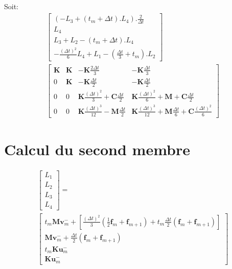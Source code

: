 \documentclass[12pt,a4paper]{report}
\begin{document}
Soit:
\begin{equation}
\begin{array}{c}
	\begin{bmatrix}	
		  \left( - L_3 + (t_m+\Delta t).L_4 \right)
		  	.\frac{2}{\Delta t}
		\\ L_4
		\\ L_3 + L_2 - (t_m+\Delta t).L_4
		\\ -\frac{(\Delta t)^2}{6} L_4 
			+ L_1 
			- \left( \frac{\Delta t}{3} + t_m \right).L_2
	\end{bmatrix}
	\\
		\begin{bmatrix}   
		   		\mathbf{K}
			&
		   		\mathbf{K}
		   	&
			   	-\mathbf{K} \frac{2\Delta t}{3} 
		   	&
		   		-\mathbf{K} \frac{\Delta t}{3} 
		\\ 	     
			   0 
			&
				\mathbf{K} 
		   	&
		   		-\mathbf{K} \frac{\Delta t}{2} 
		   	&
		   		-\mathbf{K} \frac{\Delta t}{2}
		\\   
		   		0
		   	& 
		   		0
		   	&
			   	\mathbf{K}
			   		\frac{(\Delta t)^2}{3} 
		   		+\mathbf{C} \frac{\Delta t}{2}
		   	&
		   		\mathbf{K} \frac{(\Delta t)^2}{6} 
		   		+\mathbf{M} 
			   	+\mathbf{C} \frac{\Delta t}{2}
		\\    
		   		0
		   	&
		   		0
		   	&
		   		\mathbf{K} \frac{(\Delta t)^3}{12}
		   		-\mathbf{M}
			   		\frac{\Delta t}{2} 
		   	&
		   		\mathbf{K} \frac{(\Delta t)^3}{12}
		   		+\mathbf{M} \frac{\Delta t}{6} 
			   +\mathbf{C} \frac{(\Delta t)^2}{6} 
	\end{bmatrix}
\end{array}
\end{equation}

\section{Calcul du second membre}
\begin{equation}
\begin{array}{c}
	\begin{bmatrix}	
		  L_1
		\\ L_2
		\\ L_3
		\\ L_4
	\end{bmatrix}
	=\\
	\begin{bmatrix}
	   t_m \mathbf{M} \mathbf{v}_m^-
	   + \left[
			\frac{(\Delta t)^2}{3}
				\left( \frac{1}{2} \mathbf{f}_m + \mathbf{f}_{m+1} \right)
			+t_m \frac{\Delta t}{2} (\mathbf{f}_m + \mathbf{f}_{m+1}) 
		\right]
	\\
		\mathbf{M} \mathbf{v}_m^-
		     +\frac{\Delta t}{2}  (\mathbf{f}_m + \mathbf{f}_{m+1})
	\\
		t_m \mathbf{K} \mathbf{u}_m^-
	\\
		\mathbf{K} \mathbf{u}_m^-
	\end{bmatrix}
\end{array}
\end{equation}
\end{document}
